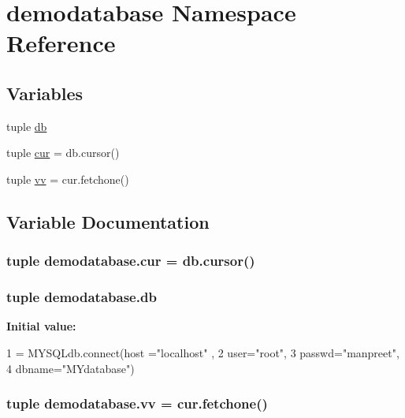 \hypertarget{namespacedemodatabase}{\section{demodatabase Namespace Reference}
\label{namespacedemodatabase}
}
\subsection*{Variables}
\begin{DoxyCompactItemize}
\item 
tuple \hyperlink{namespacedemodatabase_abd63eebd0e52f42115f7183658154745}{db}
\item 
tuple \hyperlink{namespacedemodatabase_a341223712b0bec6bc9a4979269415c63}{cur} = db.\-cursor()
\item 
tuple \hyperlink{namespacedemodatabase_a64b2104f25a63f95ba2769e3c5264e3c}{vv} = cur.\-fetchone()
\end{DoxyCompactItemize}


\subsection{Variable Documentation}
\hypertarget{namespacedemodatabase_a341223712b0bec6bc9a4979269415c63}{
\subsubsection[{cur}]{\setlength{\rightskip}{0pt plus 5cm}tuple demodatabase.\-cur = db.\-cursor()}}\label{namespacedemodatabase_a341223712b0bec6bc9a4979269415c63}
\hypertarget{namespacedemodatabase_abd63eebd0e52f42115f7183658154745}{
\subsubsection[{db}]{\setlength{\rightskip}{0pt plus 5cm}tuple demodatabase.\-db}}\label{namespacedemodatabase_abd63eebd0e52f42115f7183658154745}
{\bfseries Initial value\-:}
\begin{DoxyCode}
1 = MYSQLdb.connect(host =\textcolor{stringliteral}{"localhost"} ,
2                    user=\textcolor{stringliteral}{"root"},
3                   passwd=\textcolor{stringliteral}{"manpreet"},
4                   dbname=\textcolor{stringliteral}{"MYdatabase"})
\end{DoxyCode}
\hypertarget{namespacedemodatabase_a64b2104f25a63f95ba2769e3c5264e3c}{
\subsubsection[{vv}]{\setlength{\rightskip}{0pt plus 5cm}tuple demodatabase.\-vv = cur.\-fetchone()}}\label{namespacedemodatabase_a64b2104f25a63f95ba2769e3c5264e3c}
